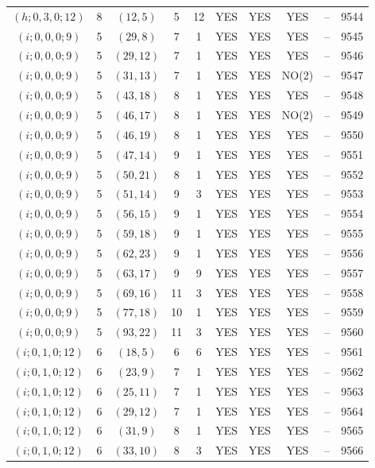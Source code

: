 \begin{longtable}{|c|c|c|c|c|c|c|c|c|c|}
$(h; 0, 3, 0; 12)$ & 8 & $(12, 5)$ & 5 & 12 & YES & YES & YES & -- & 9544\\
$(i; 0, 0, 0; 9)$ & 5 & $(29, 8)$ & 7 & 1 & YES & YES & YES & -- & 9545\\
$(i; 0, 0, 0; 9)$ & 5 & $(29, 12)$ & 7 & 1 & YES & YES & YES & -- & 9546\\
$(i; 0, 0, 0; 9)$ & 5 & $(31, 13)$ & 7 & 1 & YES & YES & NO(2) & -- & 9547\\
$(i; 0, 0, 0; 9)$ & 5 & $(43, 18)$ & 8 & 1 & YES & YES & YES & -- & 9548\\
$(i; 0, 0, 0; 9)$ & 5 & $(46, 17)$ & 8 & 1 & YES & YES & NO(2) & -- & 9549\\
$(i; 0, 0, 0; 9)$ & 5 & $(46, 19)$ & 8 & 1 & YES & YES & YES & -- & 9550\\
$(i; 0, 0, 0; 9)$ & 5 & $(47, 14)$ & 9 & 1 & YES & YES & YES & -- & 9551\\
$(i; 0, 0, 0; 9)$ & 5 & $(50, 21)$ & 8 & 1 & YES & YES & YES & -- & 9552\\
$(i; 0, 0, 0; 9)$ & 5 & $(51, 14)$ & 9 & 3 & YES & YES & YES & -- & 9553\\
$(i; 0, 0, 0; 9)$ & 5 & $(56, 15)$ & 9 & 1 & YES & YES & YES & -- & 9554\\
$(i; 0, 0, 0; 9)$ & 5 & $(59, 18)$ & 9 & 1 & YES & YES & YES & -- & 9555\\
$(i; 0, 0, 0; 9)$ & 5 & $(62, 23)$ & 9 & 1 & YES & YES & YES & -- & 9556\\
$(i; 0, 0, 0; 9)$ & 5 & $(63, 17)$ & 9 & 9 & YES & YES & YES & -- & 9557\\
$(i; 0, 0, 0; 9)$ & 5 & $(69, 16)$ & 11 & 3 & YES & YES & YES & -- & 9558\\
$(i; 0, 0, 0; 9)$ & 5 & $(77, 18)$ & 10 & 1 & YES & YES & YES & -- & 9559\\
$(i; 0, 0, 0; 9)$ & 5 & $(93, 22)$ & 11 & 3 & YES & YES & YES & -- & 9560\\
$(i; 0, 1, 0; 12)$ & 6 & $(18, 5)$ & 6 & 6 & YES & YES & YES & -- & 9561\\
$(i; 0, 1, 0; 12)$ & 6 & $(23, 9)$ & 7 & 1 & YES & YES & YES & -- & 9562\\
$(i; 0, 1, 0; 12)$ & 6 & $(25, 11)$ & 7 & 1 & YES & YES & YES & -- & 9563\\
$(i; 0, 1, 0; 12)$ & 6 & $(29, 12)$ & 7 & 1 & YES & YES & YES & -- & 9564\\
$(i; 0, 1, 0; 12)$ & 6 & $(31, 9)$ & 8 & 1 & YES & YES & YES & -- & 9565\\
$(i; 0, 1, 0; 12)$ & 6 & $(33, 10)$ & 8 & 3 & YES & YES & YES & -- & 9566\\

\end{longtable}
